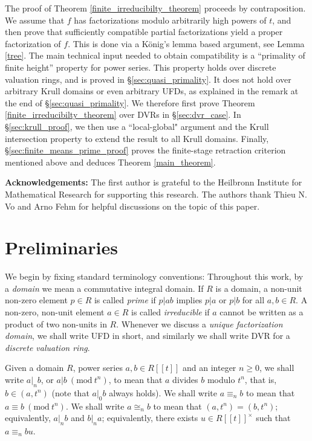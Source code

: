\documentclass{article}
\newcommand{\Mod}[1]{\ (\mathrm{mod}\ #1)}
\theoremstyle{plain}
\theoremstyle{definition}
\theoremstyle{remark}
\theoremstyle{plain}
\begin{document}
The proof of Theorem \ref{finite_irreducibilty_theorem} proceeds by contraposition. We assume that $f$ has factorizations modulo arbitrarily high powers of $t$, and then prove that sufficiently compatible partial factorizations yield a proper factorization of $f$. This is done via a K{\"o}nig's lemma based argument, see Lemma \ref{tree}. The main technical input needed to obtain compatibility is a ``primality of finite height'' property for power series. This property holds over discrete valuation rings, and is proved in \S\ref{sec:quasi_primality}. It does not hold over arbitrary Krull domains or even arbitrary UFDs, as explained in the remark at the end of \S\ref{sec:quasi_primality}. We therefore first prove Theorem \ref{finite_irreducibilty_theorem} over DVRs in \S\ref{sec:dvr_case}. In \S\ref{sec:krull_proof}, we then use a ``local-global" argument and the Krull intersection property to extend the result to all Krull domains. Finally, \S\ref{sec:finite_means_prime_proof} proves the finite-stage retraction criterion mentioned above and deduces Theorem \ref{main_theorem}.

\textbf{Acknowledgements:} The first author is grateful to the Heilbronn Institute for Mathematical Research for supporting this research. The authors thank Thieu N. Vo and Arno Fehm for helpful discussions on the topic of this paper.

\section{Preliminaries}\label{sec:preliminaries}

We begin by fixing standard terminology conventions: 
Throughout this work, by a {\it domain} we mean a commutative integral domain. If $R$ is a domain, a non-unit non-zero element $p \in R$ is called {\it prime} if $p|ab$ implies $p|a$ or $p|b$ for all $a,b \in R$. A non-zero, non-unit element $a \in R$ is called {\it irreducible} if $a$ cannot be written as a product of two non-units in $R$. Whenever we discuss a {\it unique factorization domain}, we shall write UFD in short, and similarly we shall write DVR for a {\it discrete valuation ring}. 

Given a domain $R$, power series $a,b \in R[[t]]$ and an integer $n \geq 0$, we shall write $a|_nb$, or $a| b \Mod{t^n}$, to mean that $a$ divides $b$ modulo $t^n$, that is, $b \in (a,t^n)$ (note that $a|_0 b$ always holds). We shall write $a \equiv _n b$ to mean that $a \equiv b\Mod{t^n}$. We shall write $a \cong_n b$ to mean that $(a,t^n) = (b,t^n)$; equivalently, $a|_n b$ and $b|_na$; equivalently, there exists $u \in R[[t]]^\times$ such that $a \equiv_n bu$.
\end{document}
